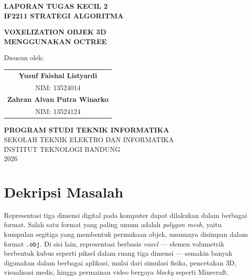 \documentclass[12pt, a4paper]{report}
\begin{document}
\begin{titlepage}
  \centering
  \vspace*{1cm}

  {\LARGE\bfseries LAPORAN TUGAS KECIL 2\\
   IF2211 STRATEGI ALGORITMA\par}

  \vspace{1.2cm}

  {\Large\bfseries
   VOXELIZATION OBJEK 3D\\
   MENGGUNAKAN OCTREE\par}

  \vspace{1.5cm}

  \vspace{0.8cm}
  Disusun oleh:

  \vspace{0.4cm}
  \begin{tabular}{c}
    \textbf{Yusuf Faishal Listyardi}\\
    NIM: 13524014\\[0.5em]
    \textbf{Zahran Alvan Putra Winarko}\\
    NIM: 13524124
  \end{tabular}

  \vfill

  {\bfseries PROGRAM STUDI TEKNIK INFORMATIKA}\\
  SEKOLAH TEKNIK ELEKTRO DAN INFORMATIKA\\
  INSTITUT TEKNOLOGI BANDUNG\\
  2026
\end{titlepage}

\tableofcontents
\listoftables
\listoffigures

\chapter{Dekripsi Masalah}

Representasi tiga dimensi digital pada komputer dapat dilakukan dalam berbagai
format. Salah satu format yang paling umum adalah \textit{polygon mesh}, yaitu
kumpulan segitiga yang membentuk permukaan objek, umumnya disimpan dalam
format \texttt{.obj}. Di sisi lain, representasi berbasis \textit{voxel} —
elemen volumetrik berbentuk kubus seperti piksel dalam ruang tiga dimensi —
semakin banyak digunakan dalam berbagai aplikasi, mulai dari simulasi fisika,
pencetakan 3D, visualisasi medis, hingga permainan video bergaya \textit{blocky}
seperti Minecraft.
\end{document}
